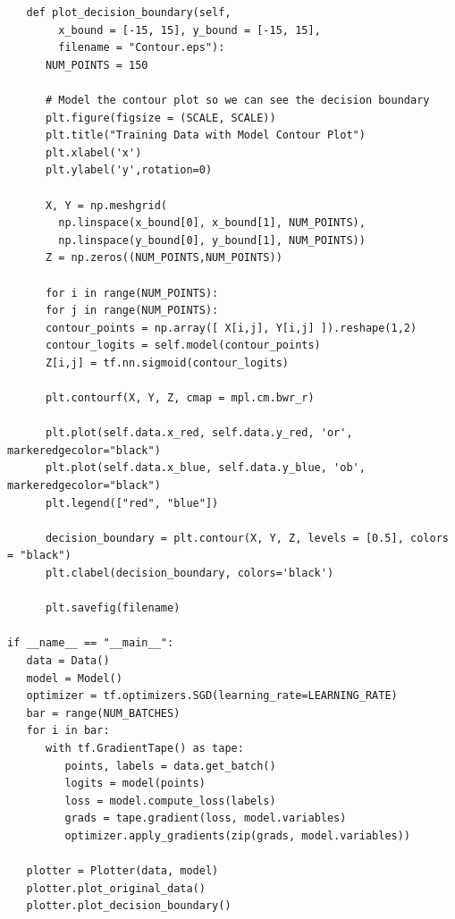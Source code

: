 \documentclass[12pt]{article}
\begin{document}
\begin{adjustwidth}{-50pt}{0pt}
\begin{Verbatim}
   def plot_decision_boundary(self,
      	x_bound = [-15, 15], y_bound = [-15, 15],
      	filename = "Contour.eps"):
      NUM_POINTS = 150
      
      # Model the contour plot so we can see the decision boundary
      plt.figure(figsize = (SCALE, SCALE))
      plt.title("Training Data with Model Contour Plot")
      plt.xlabel('x')
      plt.ylabel('y',rotation=0)
      
      X, Y = np.meshgrid(
      	np.linspace(x_bound[0], x_bound[1], NUM_POINTS),
      	np.linspace(y_bound[0], y_bound[1], NUM_POINTS))
      Z = np.zeros((NUM_POINTS,NUM_POINTS))
      
      for i in range(NUM_POINTS):
      for j in range(NUM_POINTS):
      contour_points = np.array([ X[i,j], Y[i,j] ]).reshape(1,2)
      contour_logits = self.model(contour_points)
      Z[i,j] = tf.nn.sigmoid(contour_logits)
      
      plt.contourf(X, Y, Z, cmap = mpl.cm.bwr_r)
      
      plt.plot(self.data.x_red, self.data.y_red, 'or', markeredgecolor="black")
      plt.plot(self.data.x_blue, self.data.y_blue, 'ob', markeredgecolor="black")
      plt.legend(["red", "blue"])
      
      decision_boundary = plt.contour(X, Y, Z, levels = [0.5], colors = "black")
      plt.clabel(decision_boundary, colors='black')
      
      plt.savefig(filename)

if __name__ == "__main__":
   data = Data()
   model = Model()
   optimizer = tf.optimizers.SGD(learning_rate=LEARNING_RATE)
   bar = range(NUM_BATCHES)
   for i in bar:
      with tf.GradientTape() as tape:
         points, labels = data.get_batch()
         logits = model(points)
         loss = model.compute_loss(labels)
         grads = tape.gradient(loss, model.variables)
         optimizer.apply_gradients(zip(grads, model.variables))
   
   plotter = Plotter(data, model)
   plotter.plot_original_data()
   plotter.plot_decision_boundary()
\end{Verbatim}
\end{adjustwidth}
\end{document}

